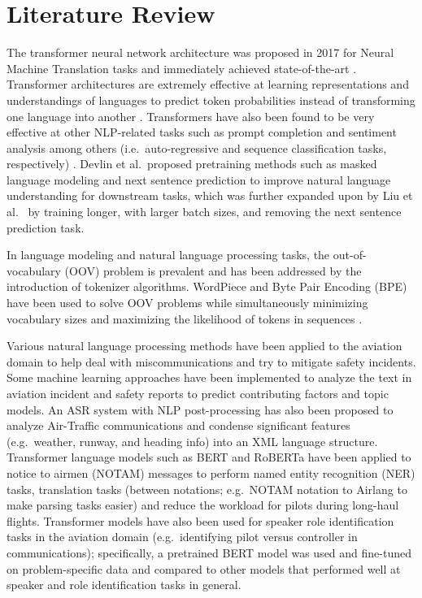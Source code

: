 \documentclass[12pt]{article}
\begin{document}
\section{Literature Review}\label{sec:lit_review}
The transformer neural network architecture was proposed in 2017 for Neural Machine Translation tasks and immediately achieved state-of-the-art \cite{vaswani_attention_2017}. Transformer architectures are extremely effective at learning representations and understandings of languages to predict token probabilities instead of transforming one language into another \cite{devlin_bert_2019,liu_roberta_2019}. Transformers have also been found to be very effective at other NLP-related tasks such as prompt completion and sentiment analysis among others (i.e.~auto-regressive and sequence classification tasks, respectively) \cite{lewis_bart_2019,radford_improving_2018}. Devlin et al.~\cite{devlin_bert_2019}proposed pretraining methods such as masked language modeling and next sentence prediction to improve natural language understanding for downstream tasks, which was further expanded upon by Liu et al.~\cite{liu_roberta_2019} by training longer, with larger batch sizes, and removing the next sentence prediction task.

In language modeling and natural language processing tasks, the out-of-vocabulary (OOV) problem is prevalent and has been addressed by the
introduction of tokenizer algorithms. WordPiece and Byte Pair Encoding (BPE) have been used to solve OOV problems while simultaneously minimizing
vocabulary sizes and maximizing the likelihood of tokens in sequences \cite{wu_googles_2016,schuster_japanese_2012,sennrich_neural_2016}.

Various natural language processing methods have been applied to the aviation domain to help deal with miscommunications and try to mitigate safety incidents\cite{ragnarsdottir_language_2003,tanguy_natural_2016,madeira_machine_2021}. Some machine learning approaches have been implemented to analyze the text in aviation incident and safety reports to predict contributing factors and topic models\cite{tanguy_natural_2016,madeira_machine_2021}. An ASR system with NLP post-processing has also been proposed to analyze Air-Traffic communications and condense significant features (e.g.~weather, runway, and heading info) into an XML language structure\cite{ragnarsdottir_language_2003}. Transformer language models such as BERT and RoBERTa have been applied to notice to airmen (NOTAM) messages to perform named entity recognition (NER) tasks, translation tasks (between notations; e.g.~NOTAM notation to Airlang to make parsing tasks easier) and reduce the workload for pilots during long-haul flights\cite{arnold_knowledge_2022}. Transformer models have also been used for speaker role identification tasks in the aviation domain (e.g.~identifying pilot versus controller in communications); specifically, a pretrained BERT model was used and fine-tuned on problem-specific data and compared to other models that performed well at speaker and role identification tasks in general\cite{guo_comparative_2022}.
\end{document}
